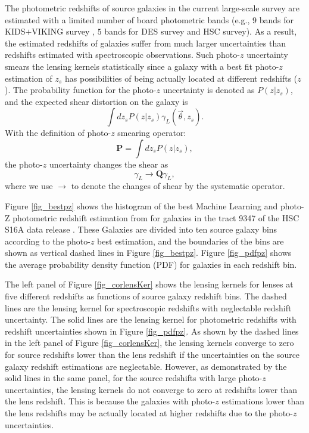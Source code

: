 \documentclass[twocolumn]{aastex62}
\begin{document}
The photometric redshifts of source galaxies in the current large-scale survey
are estimated with a limited number of board photometric bands (e.g., $9$ bands
for KIDS$+$VIKING survey \citep{KIDS_VIKING-Hildebrant2020}, $5$ bands for DES
survey and HSC survey). As a result, the estimated redshifts of galaxies suffer
from much larger uncertainties than redshifts estimated with spectroscopic
observations. Such photo-$z$ uncertainty smears the lensing kernels
statistically since a galaxy with a best fit photo-$z$ estimation of $z_s$ has
possibilities of being actually located at different redshifts ($z$).  The
probability function for the photo-$z$ uncertainty is denoted as $P(z|z_s)$,
and the expected shear distortion on the galaxy is
\begin{equation}\label{eq-delta2gamma-poz}
\int dz_s P(z|z_s) \gamma_L(\vec{\theta},z_s).
\end{equation}
With the definition of photo-$z$ smearing operator:
\begin{equation}
\mathbf{P} = \int dz_s P(z|z_s),
\end{equation}
the photo-$z$ uncertainty changes the shear as
\begin{equation}
\gamma_L \rightarrow \mathbf{Q} \gamma_L,
\end{equation}
where we use $\rightarrow$ to denote the changes of shear by the systematic
operator.


Figure \ref{fig_bestpz} shows the histogram of the best Machine Learning and
photo-Z \citep[MLZ]{MLZ-TPZ2013} photometric redshift estimation from
\cite{HSC1-photoz} for galaxies in the tract 9347 of the HSC S16A data release
\citep{HSC1-data}. These Galaxies are divided into ten source galaxy bins
according to the photo-$z$ best estimation, and the boundaries of the bins are
shown as vertical dashed lines in Figure \ref{fig_bestpz}. Figure \ref{fig_pdfpz}
shows the average probability density function (PDF) for galaxies in each
redshift bin.

The left panel of Figure \ref{fig_corlensKer} shows the lensing kernels for
lenses at five different redshifts as functions of source galaxy redshift bins.
The dashed lines are the lensing kernel for spectroscopic redshifts with
neglectable redshift uncertainty. The solid lines are the lensing kernel for
photometric redshifts with redshift uncertainties shown in Figure
\ref{fig_pdfpz}.  As shown by the dashed lines in the left panel of Figure
\ref{fig_corlensKer}, the lensing kernels converge to zero for source redshifts
lower than the lens redshift if the uncertainties on the source galaxy
redshift estimations are neglectable. However, as demonstrated by the solid
lines in the same panel, for the source redshifts with large photo-$z$
uncertainties, the lensing kernels do not converge to zero at redshifts lower
than the lens redshift. This is because the galaxies with photo-$z$ estimations
lower than the lens redshifts may be actually located at higher redshifts due
to the photo-$z$ uncertainties.
\end{document}
